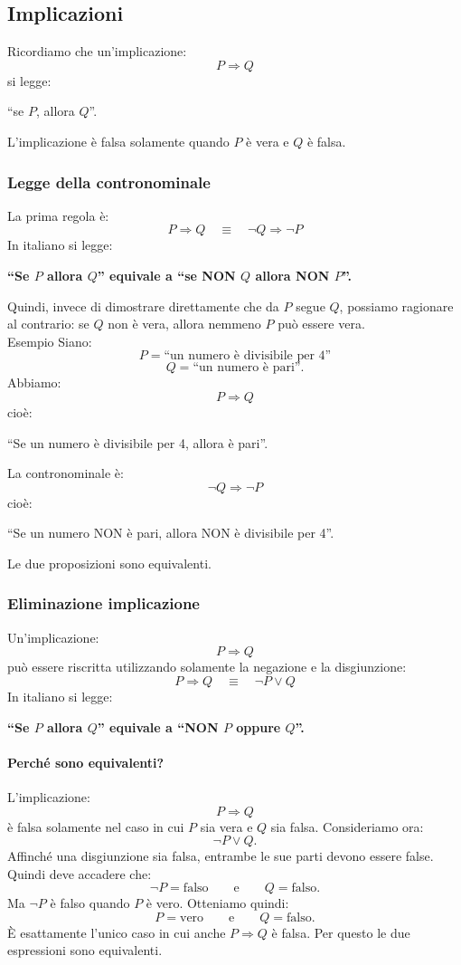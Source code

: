 \subsection{Implicazioni}
Ricordiamo che un'implicazione:
\[
P \Rightarrow Q
\]
si legge:
\begin{center}
``se $P$, allora $Q$''.
\end{center}
L'implicazione è falsa solamente quando $P$ è vera e $Q$ è falsa.
\subsubsection{Legge della contronominale}
La prima regola è:
\[
\boxed{
P \Rightarrow Q
\quad \equiv \quad
\neg Q \Rightarrow \neg P
}
\]
In italiano si legge:
\begin{center}
\textbf{``Se $P$ allora $Q$'' equivale a ``se NON $Q$ allora NON $P$''.}
\end{center}
Quindi, invece di dimostrare direttamente che da $P$ segue $Q$,
possiamo ragionare al contrario: se $Q$ non è vera, allora nemmeno
$P$ può essere vera.\\
\textcolor{verdeEsempio}{Esempio}
Siano:
\[
P = \text{``un numero è divisibile per 4''}
\]
\[
Q = \text{``un numero è pari''}.
\]
Abbiamo:
\[
P \Rightarrow Q
\]
cioè:
\begin{center}
``Se un numero è divisibile per 4, allora è pari''.
\end{center}
La contronominale è:
\[
\neg Q \Rightarrow \neg P
\]
cioè:
\begin{center}
``Se un numero NON è pari, allora NON è divisibile per 4''.
\end{center}
Le due proposizioni sono equivalenti.
\subsubsection{Eliminazione implicazione}
Un'implicazione:
\[
P \Rightarrow Q
\]
può essere riscritta utilizzando solamente la negazione e la
disgiunzione:
\[
\boxed{
P \Rightarrow Q
\quad \equiv \quad
\neg P \lor Q
}
\]
In italiano si legge:
\begin{center}
\textbf{``Se $P$ allora $Q$'' equivale a ``NON $P$ oppure $Q$''.}
\end{center}
\paragraph{Perché sono equivalenti?}
L'implicazione:
\[
P \Rightarrow Q
\]
è falsa solamente nel caso in cui $P$ sia vera e $Q$ sia falsa.
Consideriamo ora:
\[
\neg P \lor Q.
\]
Affinché una disgiunzione sia falsa, entrambe le sue parti devono
essere false. Quindi deve accadere che:
\[
\neg P = \text{falso}
\qquad\text{e}\qquad
Q = \text{falso}.
\]
Ma $\neg P$ è falso quando $P$ è vero. Otteniamo quindi:
\[
P = \text{vero}
\qquad\text{e}\qquad
Q = \text{falso}.
\]
È esattamente l'unico caso in cui anche $P \Rightarrow Q$ è falsa.
Per questo le due espressioni sono equivalenti.
